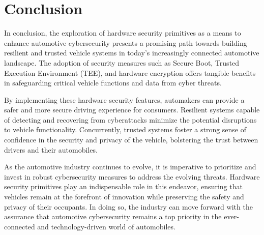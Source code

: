 \documentclass[conference]{IEEEtran}
\begin{document}
\section{Conclusion}
In conclusion, the exploration of hardware security primitives as a means to enhance automotive cybersecurity presents a promising path towards building resilient and trusted vehicle systems in today's increasingly connected automotive landscape. The adoption of security measures such as Secure Boot, Trusted Execution Environment (TEE), and hardware encryption offers tangible benefits in safeguarding critical vehicle functions and data from cyber threats.\par

By implementing these hardware security features, automakers can provide a safer and more secure driving experience for consumers. Resilient systems capable of detecting and recovering from cyberattacks minimize the potential disruptions to vehicle functionality. Concurrently, trusted systems foster a strong sense of confidence in the security and privacy of the vehicle, bolstering the trust between drivers and their automobiles.\par

As the automotive industry continues to evolve, it is imperative to prioritize and invest in robust cybersecurity measures to address the evolving threats. Hardware security primitives play an indispensable role in this endeavor, ensuring that vehicles remain at the forefront of innovation while preserving the safety and privacy of their occupants. In doing so, the industry can move forward with the assurance that automotive cybersecurity remains a top priority in the ever-connected and technology-driven world of automobiles.

\printbibliography %
\end{document}
